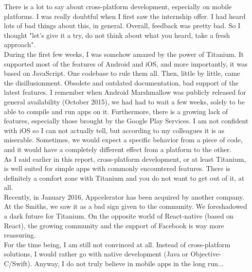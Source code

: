 There is a lot to say about cross-platform development, especially on mobile platforms. I was really doubtful when I first saw the internship offer. I had heard lots of bad things about this, in general. Overall, feedback was pretty bad. So I thought "let's give it a try, do not think about what you heard, take a fresh approach".\\
During the first few weeks, I was somehow amazed by the power of Titanium. It supported most of the features of Android and iOS, and more importantly, it was based on JavaScript. One codebase to rule them all. Then, little by little, came the disillusionment. Obsolete and outdated documentation, bad support of the latest features. I remember when Android Marshmallow was publicly released for general availability (October 2015), we had had to wait a few weeks, solely to be able to compile and run apps on it. Furthermore, there is a growing lack of features, especially those brought by the Google Play Services. I am not confident with iOS so I can not actually tell, but according to my colleagues it is as miserable. Sometimes, we would expect a specific behavior from a piece of code, and it would have a completely different effect from a platform to the other.\\
As I said earlier in this report, cross-platform development, or at least Titanium, is well suited for simple apps with commonly encountered features. There is definitely a comfort zone with Titanium and you do not want to get out of it, at all.\\
Recently, in January 2016, Appcelerator has been acquired by another company. At the Smiths, we saw it as a bad sign given to the community. We foreshadowed a dark future for Titanium. On the opposite world of React-native (based on React), the growing community and the support of Facebook is way more reassuring.\\
For the time being, I am still not convinced at all. Instead of cross-platform solutions, I would rather go with native development (Java or Objective-C/Swift). Anyway, I do not truly believe in mobile apps in the long run...

\bigskip

